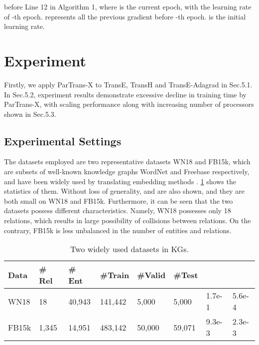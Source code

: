 \documentclass[sigconf]{acmart}
\begin{document}
before Line 12 in Algorithm 1, where  is the current epoch, with  the learning rate of -th epoch.  represents all the previous gradient before -th epoch.  is the initial learning rate.









 



\section{Experiment}
Firstly, we apply ParTrans-X to TransE, TransH and TransE-Adagrad in Sec.5.1. In Sec.5.2, experiment results demonstrate  excessive decline in training time by ParTrans-X,  with scaling performance along with increasing number of processors shown in Sec.5.3.




\subsection{Experimental Settings}

The datasets employed are two representative datasets WN18 and FB15k, which are subsets of well-known knowledge graphs WordNet and Freebase respectively, and have been widely used by translating embedding methods \cite{bordes2013translating,Wang2014Knowledge,Lin2015Learning,jia2016locally}.  \tablename \ref{dataset} shows the statistics of them. Without loss of generality,   and  are also shown, and they are both small on WN18 and FB15k. Furthermore, it can be seen that the two datasets possess different characteristics. Namely, WN18 possesses only 18 relations, which results in large possibility of collisions between relations. 
On the contrary, FB15k is less unbalanced in the number of entities and relations.


\begin{table}[htbp]
\centering
\caption{Two widely used datasets in KGs.}
\vspace{-7pt}
\label{dataset}
\begin{tabular}{|p{0.65cm}|p{0.65cm}|p{0.7cm}|p{0.78cm}|p{0.7cm}|p{0.7cm}|p{0.78cm}|p{0.78cm}|}
\hline
Data & \# Rel & \# Ent & \#Train & \#Valid & \#Test &  &  \\
\hline
WN18 &  18 & 40,943 & 141,442 & 5,000 & 5,000 & 1.7e-1& 5.6e-4 \\
\hline
FB15k & 1,345 & 14,951 & 483,142 & 50,000 & 59,071 & 9.3e-3 & 2.3e-3\\
\hline
\end{tabular}
\vspace{-7pt}
\end{table}
\end{document}
